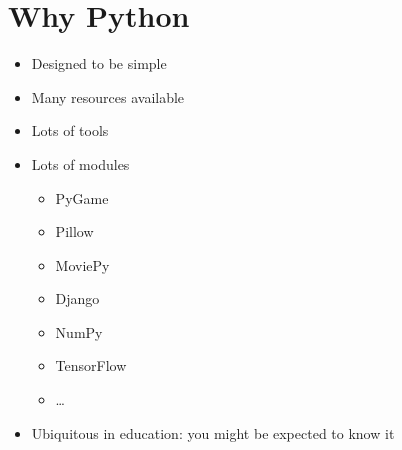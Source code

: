 \section{Why Python}

\frame{\tableofcontents[currentsection]}

\begin{frame}
  \begin{itemize}
    \item Designed to be simple
    \item Many resources available
    \item Lots of tools
    \item Lots of modules
      \begin{itemize}
        \item PyGame
        \item Pillow
        \item MoviePy
        \item Django
        \item NumPy
        \item TensorFlow
        \item \dots
      \end{itemize}
    \item Ubiquitous in education: you might be expected to know it
  \end{itemize}
\end{frame}